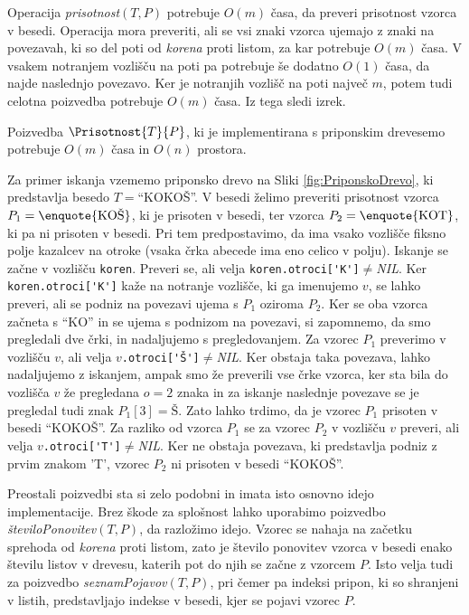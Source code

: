 Operacija \textit{prisotnost}$(T,P)$ potrebuje $O(m)$ časa, da preveri prisotnost vzorca v besedi. Operacija mora preveriti, ali se vsi znaki vzorca ujemajo z znaki na povezavah, ki so del poti od \textit{korena} proti listom, za kar potrebuje $O(m)$ časa. V vsakem notranjem vozlišču na poti pa potrebuje še dodatno $O(1)$ časa, da najde naslednjo povezavo. Ker je notranjih vozlišč na poti največ $m$, potem tudi celotna poizvedba potrebuje $O(m)$ časa. Iz tega sledi izrek.

\begin{izr}
    Poizvedba $\Prisotnost{T}{P}$, ki je implementirana s priponskim drevesemo potrebuje $O(m)$ časa in $O(n)$ prostora.
\end{izr}

Za primer iskanja vzememo priponsko drevo na Sliki \ref{fig:PriponskoDrevo}, ki predstavlja besedo $T=$\enquote{KOKOŠ}. V besedi želimo preveriti prisotnost vzorca $P_1=\text{\enquote{KOŠ}}$, ki je prisoten v besedi, ter vzorca $P_2=\text{\enquote{KOT}}$, ki pa ni prisoten v besedi. Pri tem predpostavimo, da ima vsako vozlišče fiksno polje kazalcev na otroke (vsaka črka abecede ima eno celico v polju). Iskanje se začne v vozlišču \verb|koren|. Preveri se, ali velja \verb|koren.otroci['K']|$\ne$\textit{NIL}. Ker \verb|koren.otroci['K']| kaže na notranje vozlišče, ki ga imenujemo $v$, se lahko preveri, ali se podniz na povezavi ujema s $P_1$ oziroma $P_2$. Ker se oba vzorca začneta s \enquote{KO} in se ujema s podnizom na povezavi, si zapomnemo, da smo pregledali dve črki, in nadaljujemo s pregledovanjem. Za vzorec $P_1$ preverimo v vozlišču $v$, ali velja $v$\verb|.otroci['Š']|$\ne$\textit{NIL}. Ker obstaja taka povezava, lahko nadaljujemo z iskanjem, ampak smo že preverili vse črke vzorca, ker sta bila do vozlišča $v$ že pregledana $o=2$ znaka in za iskanje naslednje povezave se je pregledal tudi znak $P_1[3]=\text{Š}$. Zato lahko trdimo, da je vzorec $P_1$ prisoten v besedi \enquote{KOKOŠ}. Za razliko od vzorca $P_1$ se za vzorec $P_2$ v vozlišču $v$ preveri, ali velja $v$\verb|.otroci['T']|$\ne$\textit{NIL}. Ker ne obstaja povezava, ki predstavlja podniz z prvim znakom 'T', vzorec $P_2$ ni prisoten v besedi \enquote{KOKOŠ}.

Preostali poizvedbi sta si zelo podobni in imata isto osnovno idejo implementacije. Brez škode za splošnost lahko uporabimo poizvedbo \textit{številoPonovitev}$(T,P)$, da razložimo idejo. Vzorec se nahaja na začetku sprehoda od \textit{korena} proti listom, zato je število ponovitev vzorca v besedi enako številu listov v drevesu, katerih pot do njih se začne z vzorcem $P$. Isto velja tudi za poizvedbo \textit{seznamPojavov}$(T,P)$, pri čemer pa indeksi pripon, ki so shranjeni v listih, predstavljajo indekse v besedi, kjer se pojavi vzorec $P$.

